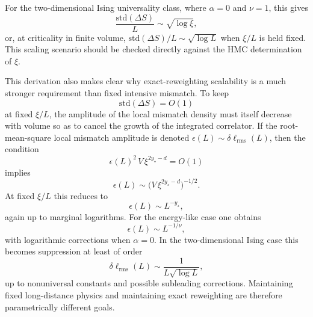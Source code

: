 \documentclass[aps,prd,reprint,nofootinbib,superscriptaddress,longbibliography]{revtex4-2}
\newcommand{\std}{\mathrm{std}}
\begin{document}
For the two-dimensional Ising universality class, where $\alpha=0$ and
$\nu=1$, this gives
\begin{equation}
\frac{\std(\Delta S)}{L}\sim \sqrt{\log \xi},
\end{equation}
or, at criticality in finite volume, $\std(\Delta S)/L \sim \sqrt{\log L}$ when
$\xi/L$ is held fixed. This scaling scenario should be checked directly against
the HMC determination of $\xi$.

This derivation also makes clear why exact-reweighting scalability is a much
stronger requirement than fixed intensive mismatch. To keep
\begin{equation}
\std(\Delta S)=O(1)
\end{equation}
at fixed $\xi/L$, the amplitude of the local mismatch density must itself
decrease with volume so as to cancel the growth of the integrated correlator.
If the root-mean-square local mismatch amplitude is denoted
$\epsilon(L)\sim \delta \ell_{\mathrm{rms}}(L)$, then the condition
\begin{equation}
\epsilon(L)^2 \, V \, \xi^{2y_\star-d}=O(1)
\end{equation}
implies
\begin{equation}
\epsilon(L)\sim \bigl(V\,\xi^{2y_\star-d}\bigr)^{-1/2}.
\end{equation}
At fixed $\xi/L$ this reduces to
\begin{equation}
\epsilon(L)\sim L^{-y_\star},
\end{equation}
again up to marginal logarithms. For the energy-like case one obtains
\begin{equation}
\epsilon(L)\sim L^{-1/\nu},
\end{equation}
with logarithmic corrections when $\alpha=0$. In the two-dimensional Ising case
this becomes suppression at least of order
\begin{equation}
\delta \ell_{\mathrm{rms}}(L)\sim \frac{1}{L\sqrt{\log L}},
\end{equation}
up to nonuniversal constants and possible subleading corrections. Maintaining
fixed long-distance physics and maintaining exact reweighting are therefore
parametrically different goals.
\end{document}
